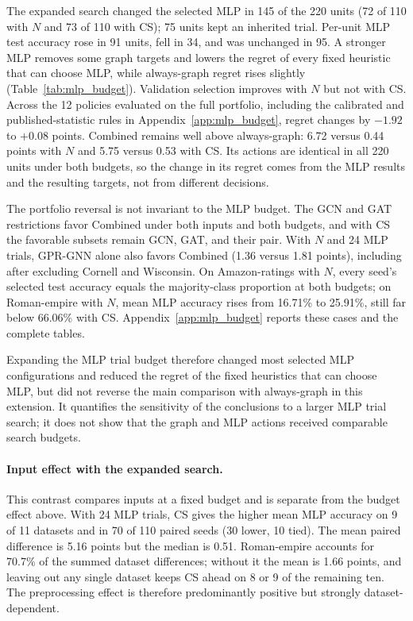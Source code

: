 The expanded search changed the selected MLP in 145 of the 220 units (72 of 110 with $N$ and 73 of 110 with CS); 75 units kept an inherited trial. Per-unit MLP test accuracy rose in 91 units, fell in 34, and was unchanged in 95. A stronger MLP removes some graph targets and lowers the regret of every fixed heuristic that can choose MLP, while always-graph regret rises slightly (Table~\ref{tab:mlp_budget}). Validation selection improves with $N$ but not with CS. Across the 12 policies evaluated on the full portfolio, including the calibrated and published-statistic rules in Appendix~\ref{app:mlp_budget}, regret changes by $-1.92$ to $+0.08$ points. Combined remains well above always-graph: 6.72 versus 0.44 points with $N$ and 5.75 versus 0.53 with CS. Its actions are identical in all 220 units under both budgets, so the change in its regret comes from the MLP results and the resulting targets, not from different decisions.

The portfolio reversal is not invariant to the MLP budget. The GCN and GAT restrictions favor Combined under both inputs and both budgets, and with CS the favorable subsets remain GCN, GAT, and their pair. With $N$ and 24 MLP trials, GPR-GNN alone also favors Combined (1.36 versus 1.81 points), including after excluding Cornell and Wisconsin. On Amazon-ratings with $N$, every seed's selected test accuracy equals the majority-class proportion at both budgets; on Roman-empire with $N$, mean MLP accuracy rises from 16.71\% to 25.91\%, still far below 66.06\% with CS. Appendix~\ref{app:mlp_budget} reports these cases and the complete tables.

Expanding the MLP trial budget therefore changed most selected MLP configurations and reduced the regret of the fixed heuristics that can choose MLP, but did not reverse the main comparison with always-graph in this extension. It quantifies the sensitivity of the conclusions to a larger MLP trial search; it does not show that the graph and MLP actions received comparable search budgets.

\paragraph{Input effect with the expanded search.}
This contrast compares inputs at a fixed budget and is separate from the budget effect above. With 24 MLP trials, CS gives the higher mean MLP accuracy on 9 of 11 datasets and in 70 of 110 paired seeds (30 lower, 10 tied). The mean paired difference is 5.16 points but the median is 0.51. Roman-empire accounts for 70.7\% of the summed dataset differences; without it the mean is 1.66 points, and leaving out any single dataset keeps CS ahead on 8 or 9 of the remaining ten. The preprocessing effect is therefore predominantly positive but strongly dataset-dependent.
